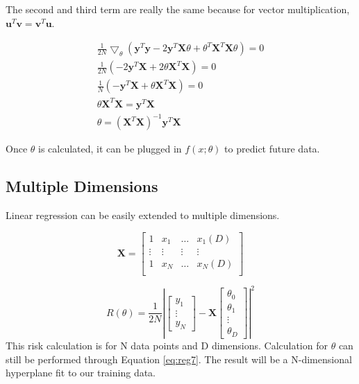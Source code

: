 \documentclass{ecctd01} %
\begin{document}
The second and third term are really the same because for vector
multiplication, $\mathbf{u}^T \mathbf{v} = \mathbf{v}^T \mathbf{u}$.  

\begin{eqnarray}
  \label{eq:reg7}
  \frac{1}{2N}  \bigtriangledown_{\theta} \left(
  \mathbf{y}^T\mathbf{y} -2
  \mathbf{y}^T\mathbf{X}\theta +
  \theta^T\mathbf{X}^T\mathbf{X}\theta
  \right) = 0 \nonumber \\
  \frac{1}{2N} \left(
  -2\mathbf{y}^T\mathbf{X}
  +2\theta\mathbf{X}^T\mathbf{X} \right) = 0 \nonumber \\
  \frac{1}{N} \left(
  -\mathbf{y}^T\mathbf{X}
  +\theta\mathbf{X}^T\mathbf{X} \right) = 0 \nonumber \\
  \theta\mathbf{X}^T\mathbf{X} =
  \mathbf{y}^T\mathbf{X} \nonumber \\
  \theta = \left(\mathbf{X}^T\mathbf{X}\right)^{-1}
  \mathbf{y}^T\mathbf{X}
\end{eqnarray}

Once $\theta$ is calculated, it can be plugged in $f(x;\theta)$
to predict future data.

\subsection{Multiple Dimensions }
Linear regression can be easily extended to multiple dimensions. 

\begin{displaymath}
  \mathbf{X} = 
  \left[ \begin{array}{cccc}
      1 & x_{1} & \hdots & x_{1}(D) \\
      \vdots & \vdots & \vdots & \vdots \\
      1 & x_{N} & \hdots & x_{N}(D) \\
  \end{array} \right] 
\end{displaymath}

\begin{displaymath}
  \label{eq:reg8}  
  R\left(\theta\right) = \frac{1}{2N}
  \left|
  \left[ \begin{array}{c}
      y_{1} \\
      \vdots \\
      y_{N}
  \end{array} \right]
  -
  \mathbf{X}
  \left[ \begin{array}{c}
      \theta_{0} \\
      \theta_{1} \\
      \vdots \\
      \theta_{D} 
  \end{array} \right]
  \right|^2 
\end{displaymath}
This risk calculation is for N data points and D
dimensions. Calculation for $\theta$ can still be performed through
Equation \eqref{eq:reg7}. The result will be a N-dimensional
hyperplane fit to our training data.  
\end{document}
